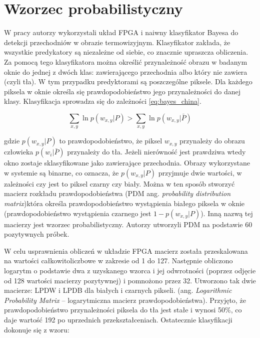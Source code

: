 \section{Wzorzec probabilistyczny}
\label{sec:xiao_2015}
W pracy \cite{xiao_2015} autorzy wykorzystali układ FPGA i naiwny klasyfikator Bayesa do detekcji przechodniów w obrazie termowizyjnym. Klasyfikator zakłada, że wszystkie predykatory są niezależne od siebie, co znacznie upraszcza obliczenia. Za pomocą tego klasyfikatora można określić przynależność obrazu w badanym oknie do jednej z dwóch klas: zawierającego przechodnia albo który nie zawiera (czyli tła). W tym przypadku predyktorami są poszczególne piksele. Dla każdego piksela w oknie określa się prawdopodobieństwo jego przynależności do danej klasy. Klasyfikacja sprowadza się do zależności \eqref{eq:bayes_china}.

\begin{equation} \label{eq:bayes_china}
\sum_{x,y} \ln p(w_{x,y}|P) > \sum_{x,y} \ln p(w_{x,y}|\bar{P})
\end{equation}

\noindent gdzie \( p(w_{x,y}|P) \) to prawdopodobieństwo, że piksel $w_{x,y}$ przynależy do obrazu człowieka
\( p(w_i|\bar{P}) \) przynależy do tła.
Jeżeli nierówność jest prawdziwa wtedy okno zostaje sklasyfikowane jako zawierające przechodnia.
Obrazy wykorzystane w systemie są binarne, co oznacza, że \( p(w_{x,y}|P) \) przyjmuje dwie wartości, w zależności czy jest to piksel czarny czy biały. Można w ten sposób stworzyć macierz rozkładu prawdopodobieństwa (PDM ang. \textit{probability distribution matrix})która określa prawdopodobieństwo wystąpienia białego piksela w oknie (prawdopodobieństwo wystąpienia czarnego jest \(1- p(w_{x,y}|P) \)). Inną nazwą tej macierzy jest wzorzec probabilistyczny.
Autorzy utworzyli PDM na podstawie 60 pozytywnych próbek.

W celu usprawnienia obliczeń w układzie FPGA macierz została przeskalowana na wartości całkowitoliczbowe w zakresie od 1 do 127.
Następnie obliczono logarytm o podstawie dwa z uzyskanego wzorca i jej odwrotności (poprzez odjęcie od 128 wartości macierzy pozytywnej) i pomnożono przez 32. %
Utworzono tak dwie macierze: LPDW i LPDB dla białych i czarnych pikseli. (ang. \textit{Logarithmic Probability Matrix} – logarytmiczna macierz prawdopodobieństwa).
Przyjęto, że prawdopodobieństwo przynależności piksela do tła jest stałe i wynosi 50\%, co daje wartość 192 po uprzednich przekształceniach.
Ostatecznie klasyfikacji dokonuje się z wzoru:

